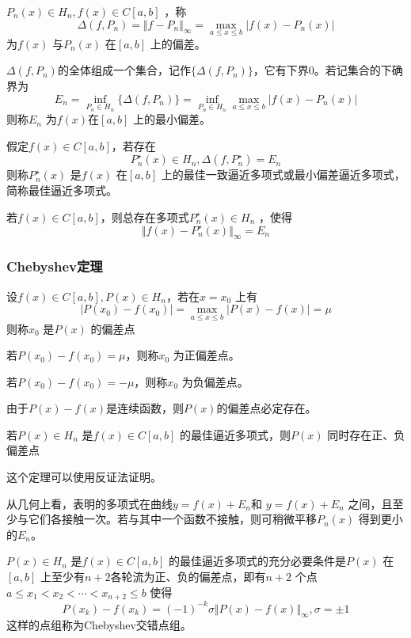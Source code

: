 \documentclass[a4paper]{article}
\begin{document}
\begin{definition}
	$P_n(x) \in H_n, f(x) \in C[a,b]$ ，称
	\[
		\Delta(f, P_n) = \Vert f - P_n \Vert_\infty = \max_{a \le x \le b} |f(x) - P_n(x) |
	\] 
	为$f(x)$ 与$P_n(x)$ 在$[a,b]$ 上的偏差。
\end{definition}
$\Delta (f, P_n)$的全体组成一个集合，记作$\{ \Delta (f, P_n) \}$，它有下界0。若记集合的下确界为
\[
	E_n = \inf_{P_n \in H_n} \{ \Delta(f,P_n)\} = \inf_{P_n \in H_n} \max_{a \le x \le b} | f(x) - P_n(x) |
\] 
则称$E_n$ 为$f(x)$在$[a,b]$ 上的最小偏差。

\begin{definition}
	假定$f(x) \in C[a,b]$，若存在
	\[
	P_n^{\star}(x) \in H_n, \Delta(f, P_n^{\star}) = E_n
	\] 
	则称$P_n^{\star}(x)$ 是$f(x)$ 在$[a,b]$ 上的最佳一致逼近多项式或最小偏差逼近多项式，简称最佳逼近多项式。
\end{definition}

\begin{theorem}
	若$f(x) \in C[a,b]$，则总存在多项式$P_n^{\star}(x) \in H_n$ ，使得
	\[
	\Vert f(x) - P_n^{\star}(x) \Vert_\infty = E_n
	\] 
\end{theorem}
\subsubsection{Chebyshev定理}
\begin{definition}
	设$f(x) \in C[a,b], P(x) \in H_n$，若在$x = x_0$ 上有
	\[
		| P(x_0) - f(x_0) | = \max_{a\le x \le b} | P(x) - f(x) | =\mu
	\] 
	则称$x_0$ 是$P(x)$ 的偏差点
\end{definition}

若$P(x_0) - f(x_0) = \mu$，则称$x_0$ 为正偏差点。

若$P(x_0) - f(x_0) = -\mu$，则称$x_0$ 为负偏差点。

由于$P(x) - f(x)$是连续函数，则$P(x)$的偏差点必定存在。

\begin{theorem}
	若$P(x) \in H_n$ 是$f(x) \in C[a,b]$ 的最佳逼近多项式，则$P(x)$ 同时存在正、负偏差点
\end{theorem}
这个定理可以使用反证法证明。

从几何上看，表明的多项式在曲线$y = f(x) + E_n$和 $y = f(x) + E_n$ 之间，且至少与它们各接触一次。若与其中一个函数不接触，则可稍微平移$P_n(x)$ 得到更小的$E_n$。

\begin{theorem}
	$P(x) \in H_n$ 是$f(x) \in C[a,b]$ 的最佳逼近多项式的充分必要条件是$P(x)$ 在$[a,b]$ 上至少有$n+2$各轮流为正、负的偏差点，即有$n+2$ 个点$a \le x_1 < x_2 < \cdots < x_{n+2} \le b$ 使得
	\[
	P(x_{k}) - f(x_{k}) = (-1)^{-k} \sigma \Vert P(x) - f(x) \Vert_\infty, \sigma = \pm 1
	\] 
	这样的点组称为Chebyshev交错点组。
\end{theorem}
\end{document}
